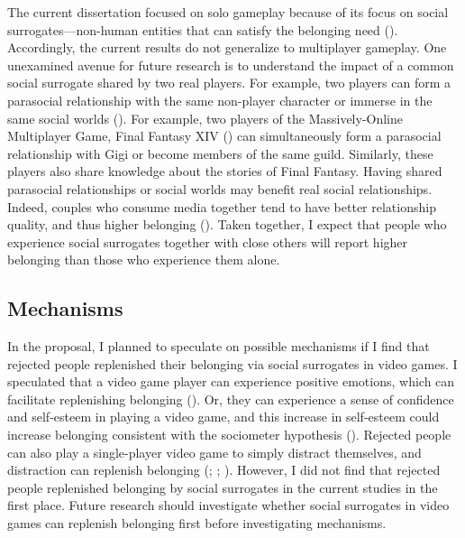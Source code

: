 \documentclass[
]{udthesis}
\begin{document}
The current dissertation focused on solo gameplay because of its focus
on social surrogates---non-human entities that can satisfy the belonging
need (). Accordingly, the current results do not generalize
to multiplayer gameplay. One unexamined avenue for future research is to
understand the impact of a common social surrogate shared by two real
players. For example, two players can form a parasocial relationship
with the same non-player character or immerse in the same social worlds
(). For example, two players of the Massively-Online
Multiplayer Game, Final Fantasy XIV () can simultaneously form
a parasocial relationship with Gigi or become members of the same guild.
Similarly, these players also share knowledge about the stories of Final
Fantasy. Having shared parasocial relationships or social worlds may
benefit real social relationships. Indeed, couples who consume media
together tend to have better relationship quality, and thus higher
belonging (). Taken together, I expect that people who
experience social surrogates together with close others will report
higher belonging than those who experience them alone.

\subsection{Mechanisms}\label{mechanisms}

In the proposal, I planned to speculate on possible mechanisms if I find
that rejected people replenished their belonging via social surrogates
in video games. I speculated that a video game player can experience
positive emotions, which can facilitate replenishing belonging
(). Or, they can experience a
sense of confidence and self-esteem in playing a video game, and this
increase in self-esteem could increase belonging consistent with the
sociometer hypothesis ().
Rejected people can also play a single-player video game to simply
distract themselves, and distraction can replenish belonging
(; ; ). However, I did not find that
rejected people replenished belonging by social surrogates in the
current studies in the first place. Future research should investigate
whether social surrogates in video games can replenish belonging first
before investigating mechanisms.
\end{document}
